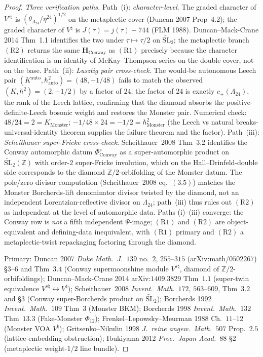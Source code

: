 \begin{proof}[Proof]
\emph{Three verification paths.}
Path~(i): \emph{character-level}. The graded character of
$V^{s\natural}$ is $(\theta_{\Lambda_{24}}/\eta^{24})^{1/2}$ on
the metaplectic cover (Duncan 2007 Prop~4.2); the graded character
of $V^\natural$ is $J(\tau) = j(\tau) - 744$ (FLM 1988).
Duncan--Mack-Crane 2014 Thm~1.1 identifies the two under
$\tau\mapsto\tau/2$ on $\widetilde{\mathrm{SL}}_2$; the
metaplectic branch $(\mathrm{R2})$ returns the same
$\mathbf{H}_{\mathrm{Conway}}$ as $(\mathrm{R1})$ precisely
because the character identification is an identity of
McKay--Thompson series on the double cover, not on the base.
Path~(ii): \emph{Lusztig pair cross-check}. The would-be autonomous
Leech pair $(K^{\mathrm{auto}},\hbar^2_{\mathrm{auto}}) = (48,-1/48)$
fails to match the observed $(K,\hbar^2) = (2,-1/2)$ by a factor
of $24$; the factor of $24$ is exactly $c_+(\Lambda_{24})$, the
rank of the Leech lattice, confirming that the diamond absorbs
the positive-definite-Leech bosonic weight and restores the
Monster pair. Numerical check: $48 / 24 = 2 = K_{\mathrm{Monster}}$;
$-1/48 \times 24 = -1/2 = \hbar^2_{\mathrm{Monster}}$
(the Leech vs natural breaks-universal-identity theorem
supplies the failure theorem and the factor).
Path~(iii): \emph{Scheithauer super-Fricke cross-check}.
Scheithauer~2008 Thm~3.2 identifies the Conway automorphic
datum $\Phi^{s}_{\mathrm{Conway}}$ as a super-automorphic
product on $\widetilde{\mathrm{SL}}_2(\mathbb{Z})$ with
order-$2$ super-Fricke involution, which on the
Hall--Drinfeld-double side corresponds to the diamond
$\mathbb{Z}/2$-orbifolding of the Monster datum. The pole/zero
divisor computation
(Scheithauer~2008 eq.~$(3.5)$) matches the Monster Borcherds-lift
denominator divisor twisted by the diamond, not an independent
Lorentzian-reflective divisor on $\Lambda_{24}$; path~(iii)
thus rules out $(\mathrm{R2})$ as independent at the level of
automorphic data.
Paths (i)--(iii) converge: the Conway row is \emph{not} a fifth
independent $\Psi$-image; $(\mathrm{R1})$ and $(\mathrm{R2})$ are
object-equivalent and defining-data inequivalent, with
$(\mathrm{R1})$ primary and $(\mathrm{R2})$ a metaplectic-twist
repackaging factoring through the diamond.

Primary:
Duncan 2007 \emph{Duke Math.~J.}~$139$ no.~$2$, $255$--$315$
(arXiv:math/$0502267$) \S 3--6 and Thm~$3.4$
(Conway supermoonshine module $V^{s\natural}$,
diamond of $\mathbb{Z}/2$-orbifoldings);
Duncan--Mack-Crane 2014 arXiv:$1409.3829$ Thm~$1.1$
(super-twin equivalence $V^{s\natural}\leftrightarrow V^\natural$);
Scheithauer~2008 \emph{Invent.~Math.}~$172$, $563$--$609$,
Thm~$3.2$ and \S$3$
(Conway super-Borcherds product on $\widetilde{\mathrm{SL}}_2$);
Borcherds 1992 \emph{Invent.~Math.}~$109$ Thm~$3$ (Monster BKM);
Borcherds 1998 \emph{Invent.~Math.}~$132$ Thm~$13.3$
(Fake-Monster $\Phi_{12}$);
Frenkel--Lepowsky--Meurman 1988 Ch.~$11$--$12$
(Monster VOA $V^\natural$);
Gritsenko--Nikulin 1998 \emph{J.~reine angew.~Math.}~$507$
Prop.~$2.5$ (lattice-embedding obstruction);
Ibukiyama 2012 \emph{Proc.~Japan Acad.}~$88$ \S 2
(metaplectic weight-$1/2$ line bundle).
\end{proof}

